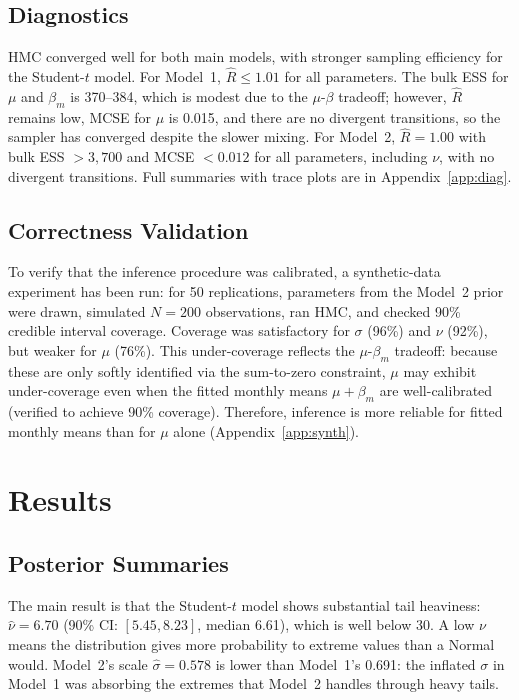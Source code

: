 \documentclass[10pt]{article}
\begin{document}
\subsection{Diagnostics}
HMC converged well for both main models, with stronger sampling efficiency for the Student-$t$ model. For Model~1, $\hat{R} \leq 1.01$ for all parameters. The bulk ESS for $\mu$ and $\beta_m$ is 370--384, which is modest due to the $\mu$-$\beta$ tradeoff; however, $\hat{R}$ remains low, MCSE for $\mu$ is 0.015, and there are no divergent transitions, so the sampler has converged despite the slower mixing. For Model~2, $\hat{R} = 1.00$ with bulk ESS $> 3{,}700$ and MCSE $< 0.012$ for all parameters, including $\nu$, with no divergent transitions. Full summaries with trace plots are in Appendix~\ref{app:diag}.

\subsection{Correctness Validation}
To verify that the inference procedure was calibrated, a synthetic-data experiment has been run: for 50 replications, parameters from the Model~2 prior were drawn, simulated $N=200$ observations, ran HMC, and checked 90\% credible interval coverage. Coverage was satisfactory for $\sigma$ (96\%) and $\nu$ (92\%), but weaker for $\mu$ (76\%). This under-coverage reflects the $\mu$-$\beta_m$ tradeoff: because these are only softly identified via the sum-to-zero constraint, $\mu$ may exhibit under-coverage even when the fitted monthly means $\mu + \beta_m$ are well-calibrated (verified to achieve 90\% coverage). Therefore, inference is more reliable for fitted monthly means than for $\mu$ alone (Appendix~\ref{app:synth}).



\section{Results}\label{sec:results}

\subsection{Posterior Summaries}
The main result is that the Student-$t$ model shows substantial tail heaviness: $\hat{\nu} = 6.70$ (90\% CI: $[5.45, 8.23]$, median 6.61), which is well below 30. A low $\nu$ means the distribution gives more probability to extreme values than a Normal would. Model~2's scale $\hat{\sigma} = 0.578$ is lower than Model~1's 0.691: the inflated $\sigma$ in Model~1 was absorbing the extremes that Model~2 handles through heavy tails.
\end{document}
